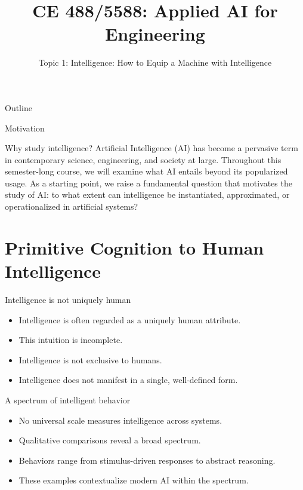 \documentclass[12pt]{beamer}
\title{CE 488/5588: Applied AI for Engineering}
\subtitle{Topic 1: Intelligence: How to Equip a Machine with Intelligence}
\author{}
\date{}
\begin{document}
\begin{frame}
  \titlepage
\end{frame}

\begin{frame}{Outline}
  \tableofcontents
\end{frame}

\begin{frame}{Motivation}
  \begin{conceptbox}{Why study intelligence?}
    Artificial Intelligence (AI) has become a pervasive term in contemporary science, engineering, and society at large. Throughout this semester-long course, we will examine what AI entails beyond its popularized usage. As a starting point, we raise a fundamental question that motivates the study of AI: to what extent can intelligence be instantiated, approximated, or operationalized in artificial systems?
  \end{conceptbox}
\end{frame}

\section{Primitive Cognition to Human Intelligence}

\begin{frame}{Intelligence is not uniquely human}
  \begin{itemize}
    \item Intelligence is often regarded as a uniquely human attribute.
    \item This intuition is incomplete.
    \item Intelligence is not exclusive to humans.
    \item Intelligence does not manifest in a single, well-defined form.
  \end{itemize}
\end{frame}

\begin{frame}{A spectrum of intelligent behavior}
  \begin{itemize}
    \item No universal scale measures intelligence across systems.
    \item Qualitative comparisons reveal a broad spectrum.
    \item Behaviors range from stimulus-driven responses to abstract reasoning.
    \item These examples contextualize modern AI within the spectrum.
  \end{itemize}
\end{frame}
\end{document}
